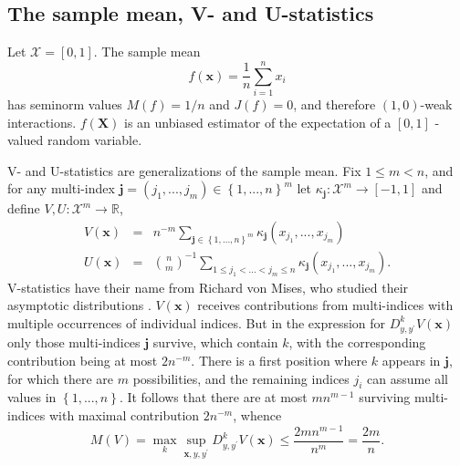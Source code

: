 \documentclass[final,12pt]{colt2018} %
\begin{document}
		\subsection{The sample mean, V- and U-statistics\label{Subsection MandU
				statistics}}
		
		Let $\mathcal{X=}\left[ 0,1\right] $. The sample mean%
		\begin{equation*}
		f\left( \mathbf{x}\right) =\frac{1}{n}\sum_{i=1}^{n}x_{i} 
		\end{equation*}%
		has seminorm values $M\left( f\right) =1/n$ and $J\left( f\right) =0$, and
		therefore $\left( 1,0\right) $-weak interactions. $f\left( \mathbf{X}\right) 
		$ is an unbiased estimator of the expectation of a $\left[ 0,1\right] $%
		-valued random variable.
		
		V- and U-statistics are generalizations of the sample mean. Fix $1\leq m<n$,
		and for any multi-index $\mathbf{j}=\left( j_{1},...,j_{m}\right) \in
		\left\{ 1,...,n\right\} ^{m}$ let $\kappa _{\mathbf{j}}:\mathcal{X}%
		^{m}\rightarrow \left[ -1,1\right] $ and define $V,U:\mathcal{X}%
		^{m}\rightarrow 
		\mathbb{R}
		$,%
		\begin{eqnarray*}
			V\left( \mathbf{x}\right) &=&n^{-m}\sum_{\mathbf{j}\in \left\{
				1,...,n\right\} ^{m}}\kappa _{\mathbf{j}}\left(
			x_{j_{1}},...,x_{j_{m}}\right) \\
			U\left( \mathbf{x}\right) &=&\binom{n}{m}^{-1}\sum_{1\leq
				j_{1}<...<j_{m}\leq n}\kappa _{\mathbf{j}}\left(
			x_{j_{1}},...,x_{j_{m}}\right) .
		\end{eqnarray*}%
		V-statistics have their name from Richard von Mises, who studied their
		asymptotic distributions \citep{Van Mises}. $V\left( \mathbf{x}\right) $
		receives contributions from multi-indices with multiple occurrences of
		individual indices. But in the expression for $D_{y,y^{\prime }}^{k}V\left( 
		\mathbf{x}\right) $ only those multi-indices $\mathbf{j}$ survive, which
		contain $k$, with the corresponding contribution being at most $2n^{-m}$.
		There is a first position where $k$ appears in $\mathbf{j}$, for which there
		are $m$ possibilities, and the remaining indices $j_{i}$ can assume all
		values in $\left\{ 1,...,n\right\} $. It follows that there are at most $%
		mn^{m-1}$ surviving multi-indices with maximal contribution $2n^{-m}$, whence%
		\begin{equation*}
		M\left( V\right) =\max_{k}\sup_{\mathbf{x},y,y^{\prime }}D_{y,y^{\prime
			}}^{k}V\left( \mathbf{x}\right) \leq \frac{2mn^{m-1}}{n^{m}}=\frac{2m}{n}. 
			\end{equation*}%
\end{document}
